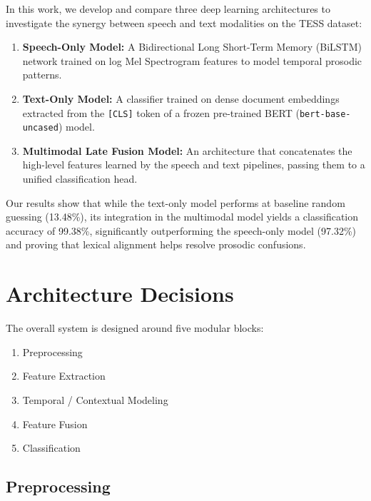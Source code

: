\documentclass[11pt,journal,onecolumn]{IEEEtran}
\begin{document}
In this work, we develop and compare three deep learning architectures to investigate the synergy between speech and text modalities on the TESS dataset:
\begin{enumerate}
    \item \textbf{Speech-Only Model:} A Bidirectional Long Short-Term Memory (BiLSTM) network trained on log Mel Spectrogram features to model temporal prosodic patterns.
    \item \textbf{Text-Only Model:} A classifier trained on dense document embeddings extracted from the \texttt{[CLS]} token of a frozen pre-trained BERT (\texttt{bert-base-uncased}) model.
    \item \textbf{Multimodal Late Fusion Model:} An architecture that concatenates the high-level features learned by the speech and text pipelines, passing them to a unified classification head.
\end{enumerate}
Our results show that while the text-only model performs at baseline random guessing (13.48\%), its integration in the multimodal model yields a classification accuracy of 99.38\%, significantly outperforming the speech-only model (97.32\%) and proving that lexical alignment helps resolve prosodic confusions.


\newpage

\section{Architecture Decisions}

The overall system is designed around five modular blocks:
\begin{enumerate}
    \item Preprocessing
    \item Feature Extraction
    \item Temporal / Contextual Modeling
    \item Feature Fusion
    \item Classification
\end{enumerate}

\subsection{Preprocessing}
\end{document}
